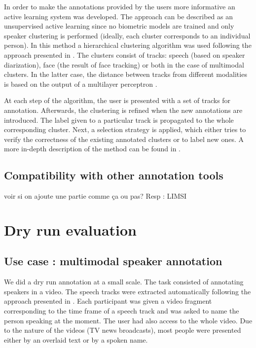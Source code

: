 \documentclass[a4paper]{article}
\begin{document}
In order to make the annotations provided by the users more informative an active learning system 
was developed. The approach can be described as an unsupervised active learning since no biometric models are trained and only speaker clustering is performed (ideally, each cluster corresponds to an individual person).  In this method a hierarchical clustering algorithm was used 
following the  approach presented in \cite{poignant2012unsupervised}.  The clusters consist of tracks: speech (based on speaker diarization),  face (the result of face tracking) or both in the case of multimodal clusters. In the latter case, the distance between tracks from different modalities is based on the output of a multilayer perceptron \cite{bredin2012fusion}.

At each step of the algorithm, the user is presented with a set of tracks for annotation. Afterwards, the clustering is refined when the new annotations are introduced.
The label given to a particular track is propagated to the whole corresponding cluster. Next, a selection strategy is applied, which either tries to verify the correctness of the existing annotated clusters or to label new ones.
A more in-depth description of the method can be found in \cite{budnik2014automatic}.

      \subsection{Compatibility with other annotation tools}
voir si on ajoute une partie comme ça ou pas?
Resp : LIMSI



  \section{Dry run evaluation}
      \subsection{Use case : multimodal speaker annotation}
     

We did a dry run annotation at a small scale. The task consisted of annotating speakers in a video. The speech tracks were extracted automatically following the approach presented in \cite{barras2006multistage}.
Each participant was given a video fragment corresponding to the time frame of a speech track and was asked to name the person speaking at the moment.
The user had also access to the whole video. Due to the nature of the videos (TV news broadcasts), most people were presented either by an overlaid text or by a spoken name.
 
\end{document}
